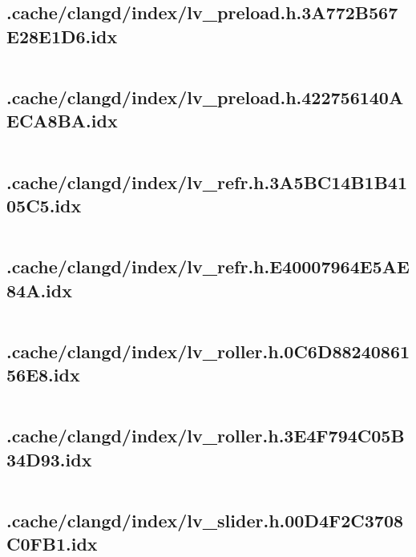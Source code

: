 \subsection{.cache/clangd/index/lv_preload.h.3A772B567E28E1D6.idx}
\inputminted[linenos,tabsize=2,breaklines, breakanywhere]{c}{lv_preload.h.3A772B567E28E1D6.idx}
\pagebreak

\subsection{.cache/clangd/index/lv_preload.h.422756140AECA8BA.idx}
\inputminted[linenos,tabsize=2,breaklines, breakanywhere]{c}{lv_preload.h.422756140AECA8BA.idx}
\pagebreak

\subsection{.cache/clangd/index/lv_refr.h.3A5BC14B1B4105C5.idx}
\inputminted[linenos,tabsize=2,breaklines, breakanywhere]{c}{lv_refr.h.3A5BC14B1B4105C5.idx}
\pagebreak

\subsection{.cache/clangd/index/lv_refr.h.E40007964E5AE84A.idx}
\inputminted[linenos,tabsize=2,breaklines, breakanywhere]{c}{lv_refr.h.E40007964E5AE84A.idx}
\pagebreak

\subsection{.cache/clangd/index/lv_roller.h.0C6D8824086156E8.idx}
\inputminted[linenos,tabsize=2,breaklines, breakanywhere]{c}{lv_roller.h.0C6D8824086156E8.idx}
\pagebreak

\subsection{.cache/clangd/index/lv_roller.h.3E4F794C05B34D93.idx}
\inputminted[linenos,tabsize=2,breaklines, breakanywhere]{c}{lv_roller.h.3E4F794C05B34D93.idx}
\pagebreak

\subsection{.cache/clangd/index/lv_slider.h.00D4F2C3708C0FB1.idx}
\inputminted[linenos,tabsize=2,breaklines, breakanywhere]{c}{lv_slider.h.00D4F2C3708C0FB1.idx}
\pagebreak

